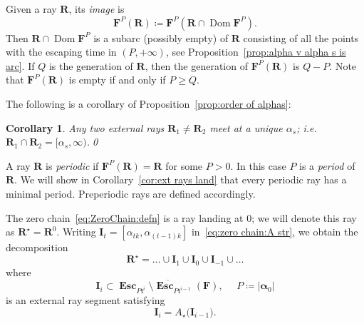\documentclass{amsart}
\newcommand{\Dom}{\operatorname {Dom}}
\renewcommand{\sp}{{\ \ }}
\newcommand{\1}{{\mathbb 1 }}
\newcommand\binfty{{\infty}}%
\newcommand{\bF}{{\mathbf F}}
\newcommand{\bR}{{\mathbf R}}
\newcommand{\bI}{{\mathbf I}}
\newcommand{\str}{{\star}}
\renewcommand{\tt}{\mathfrak{t}}
\newtheorem{cor}[thm]{Corollary}
\theoremstyle{remark}
\numberwithin{equation}{section}
\theoremstyle{definition}
\newcommand{\Esc}{{\boldsymbol{\operatorname{Esc}}}}
\newcommand{\balpha}{{\boldsymbol \alpha}}
\theoremstyle{nonumberbreak}
\begin{document}
Given a ray $\bR$, its \emph{image} is \[\bF^P(\bR)\coloneqq \bF^P(\bR\cap \Dom \bF^P).\]
Then $\bR\cap \Dom \bF^P$ is a subarc (possibly empty) of $\bR$ consisting of all the points with the escaping time in $(P,+\infty)$, see Proposition~\ref{prop:alpha v alpha s is arc}.  If $Q$ is the generation of $\bR$, then the generation of $\bF^P(\bR)$ is $Q-P$. Note that $\bF^P(\bR)$ is empty if and only if $P\ge Q$.


The following is a corollary of Proposition~\ref{prop:order of alphas}:
\begin{cor}
\label{cor:rays meet}
Any two external rays $\bR_1\neq \bR_2$ meet at a unique $\alpha_s$; i.e.~$\bR_1\cap \bR_2=[\alpha_s,\binfty)$.\qed
\end{cor}

A ray $\bR$ is \emph{periodic} if $\bF^P(\bR)=\bR$ for some $P>0$. In this case $P$ is a \emph{period} of $\bR$. We will show in Corollary~\ref{cor:ext rays land} that every periodic ray has a minimal period. Preperiodic rays are defined accordingly.

 
The zero chain~\eqref{eq:ZeroChain:defn} is a ray  landing at $0$; we will denote this ray as $\bR^\str=\bR^0$. Writing $\bI_t=[\alpha_{t k}, \alpha_{(t-1)k}]$
 in~\eqref{eq:zero chain:A str}, we obtain the decomposition
\begin{equation}
\label{eq:bRstr:decomp}
\bR^\str= \dots \cup \bI_1 \cup \bI_0\cup \bI_{-1}\cup \dots
\end{equation}
where 
\begin{equation}
\bI_i\subset \overline{\Esc_{P\tt^i}\setminus \Esc_{P\tt^{i-1}}(\bF)},\sp\sp \sp P\coloneqq |\balpha_0|
\end{equation}
 is an external ray segment satisfying 
\begin{equation}
\label{eq:I:lem:ray decomp as fund segm}
\bI_{i}=A_\str\big( \bI_{i-1}\big).
\end{equation}
\end{document}
